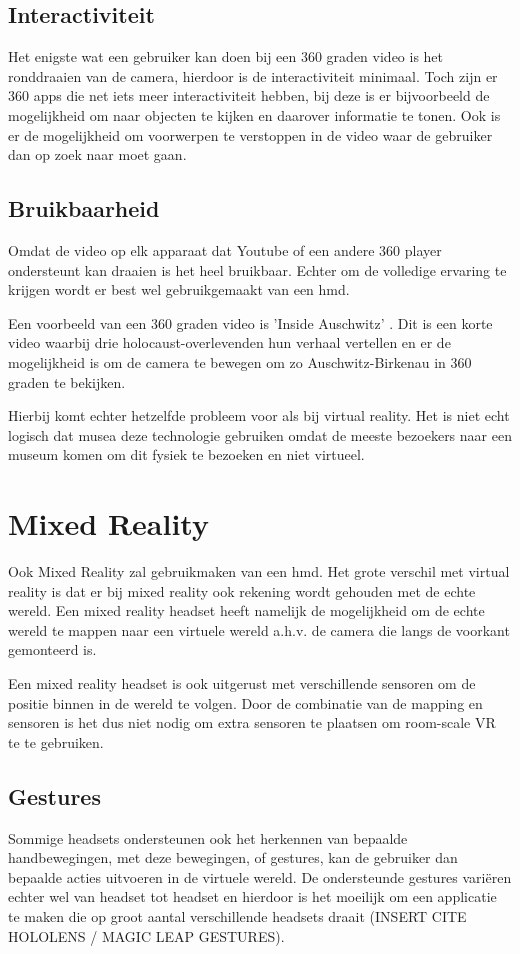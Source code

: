 \subsection{Interactiviteit}
Het enigste wat een gebruiker kan doen bij een 360 graden video is het ronddraaien van de camera, hierdoor is de interactiviteit minimaal. Toch zijn er 360 apps die net iets meer interactiviteit hebben, bij deze is er bijvoorbeeld de mogelijkheid om naar objecten te kijken en daarover informatie te tonen. Ook is er de mogelijkheid om voorwerpen te verstoppen in de video waar de gebruiker dan op zoek naar moet gaan.
\subsection{Bruikbaarheid}
Omdat de video op elk apparaat dat Youtube of een andere 360 player ondersteunt kan draaien is het heel bruikbaar. Echter om de volledige ervaring te krijgen wordt er best wel gebruikgemaakt van een \acrshort{hmd}.

Een voorbeeld van een 360 graden video is 'Inside Auschwitz' \autocite{WDR2017}. Dit is een korte video waarbij drie holocaust-overlevenden hun verhaal vertellen en er de mogelijkheid is om de camera te bewegen om zo Auschwitz-Birkenau in 360 graden te bekijken. 

Hierbij komt echter hetzelfde probleem voor als bij virtual reality. Het is niet echt logisch dat musea deze technologie gebruiken omdat de meeste bezoekers naar een museum komen om dit fysiek te bezoeken en niet virtueel.

\section{Mixed Reality} \label{sec:mixedreality}
Ook Mixed Reality zal gebruikmaken van een \acrshort{hmd}. Het grote verschil met virtual reality is dat er bij mixed reality ook rekening wordt gehouden met de echte wereld. Een mixed reality headset heeft namelijk de mogelijkheid om de echte wereld te mappen naar een virtuele wereld a.h.v. de camera die langs de voorkant gemonteerd is.

Een mixed reality headset is ook uitgerust met verschillende sensoren om de positie binnen in de wereld te volgen. Door de combinatie van de mapping en sensoren is het dus niet nodig om extra sensoren te plaatsen om room-scale VR te te gebruiken.

\subsection{Gestures}
Sommige headsets ondersteunen ook het herkennen van bepaalde handbewegingen, met deze bewegingen, of gestures, kan de gebruiker dan bepaalde acties uitvoeren in de virtuele wereld. De ondersteunde gestures variëren echter wel van headset tot headset en hierdoor is het moeilijk om een applicatie te maken die op groot aantal verschillende headsets draait (INSERT CITE HOLOLENS / MAGIC LEAP GESTURES).

